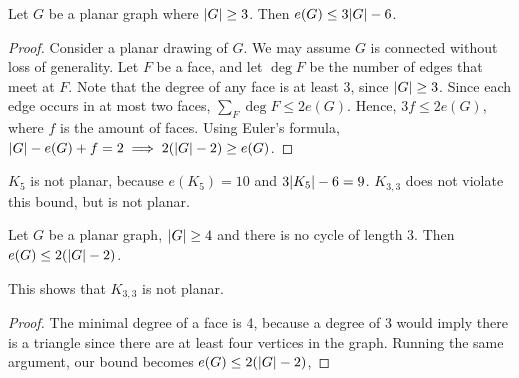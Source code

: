 \begin{corollary}
	Let \( G \) be a planar graph where \( \abs{G} \geq 3 \).
	Then \( e(G) \leq 3\abs{G} - 6 \).
\end{corollary}
\begin{proof}
	Consider a planar drawing of \( G \).
	We may assume \( G \) is connected without loss of generality.
	Let \( F \) be a face, and let \( \deg F \) be the number of edges that meet at \( F \).
	Note that the degree of any face is at least 3, since \( \abs{G} \geq 3 \).
	Since each edge occurs in at most two faces, \( \sum_F \deg F \leq 2e(G) \).
	Hence, \( 3f \leq 2e(G) \), where \( f \) is the amount of faces.
	Using Euler's formula, \( \abs{G} - e(G) + f = 2 \implies 2(\abs{G} - 2) \geq e(G) \).
\end{proof}
\begin{remark}
	\( K_5 \) is not planar, because \( e(K_5) = 10 \) and \( 3 \abs{K_5} - 6 = 9 \).
	\( K_{3,3} \) does not violate this bound, but is not planar.
\end{remark}
\begin{corollary}
	Let \( G \) be a planar graph, \( \abs{G} \geq 4 \) and there is no cycle of length 3.
	Then \( e(G) \leq 2(\abs{G} - 2) \).
\end{corollary}
This shows that \( K_{3,3} \) is not planar.
\begin{proof}
	The minimal degree of a face is 4, because a degree of 3 would imply there is a triangle since there are at least four vertices in the graph.
	Running the same argument, our bound becomes \( e(G) \leq 2(\abs{G} - 2) \),
\end{proof}
